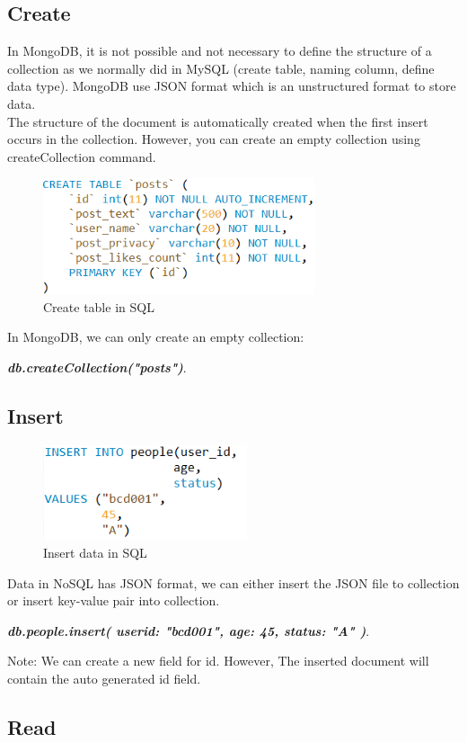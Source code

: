 \documentclass[conference]{IEEEtran}
\begin{document}
\subsection{Create}
In MongoDB, it is not possible and not necessary to define the structure of a collection as we normally did in MySQL (create table, naming column, define data type). MongoDB use JSON format which is an unstructured format to store data.\\
The structure of the document is automatically created when the first insert occurs in the collection. However, you can create an empty collection using createCollection command.
\begin{figure}[H]
    \centering
    \includegraphics[width=8cm]{createsql}
    \caption{Create table in SQL}
    \label{fig:fig4}
\end{figure}
In MongoDB, we can only create an empty collection:
\begin{center}
\textbf{\textit{db.createCollection("posts")}}.
\end{center}
\subsection{Insert}
\begin{figure}[H]
    \centering
    \includegraphics[width=6cm]{insertsql}
    \caption{Insert data in SQL}
    \label{fig:fig4}
\end{figure}
Data in NoSQL has JSON format, we can either insert the JSON file to collection or insert key-value pair into collection.
\begin{center}
\textbf{\textit{db.people.insert(
   { userid: "bcd001", age: 45, status: "A" }
)}}.
\end{center}
Note: We can create a new field for id. However, The inserted document will contain the auto generated id field.
\subsection{Read}
\end{document}
